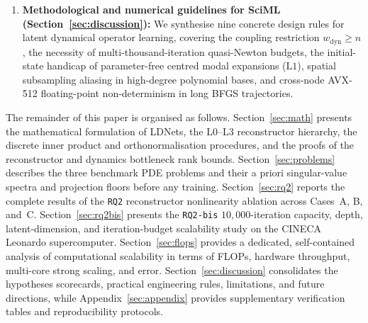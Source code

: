 \begin{enumerate}[leftmargin=2em]
  \item \textbf{Methodological and numerical guidelines for SciML (Section~\ref{sec:discussion}):} We synthesise nine concrete design rules for latent dynamical operator learning, covering the coupling restriction $w_{\mathrm{dyn}} \ge n$, the necessity of multi-thousand-iteration quasi-Newton budgets, the initial-state handicap of parameter-free centred modal expansions ($\mathrm{L1}$), spatial subsampling aliasing in high-degree polynomial bases, and cross-node AVX-512 floating-point non-determinism in long BFGS trajectories.
\end{enumerate}

The remainder of this paper is organised as follows. Section~\ref{sec:math} presents the mathematical formulation of LDNets, the $\mathrm{L0}$--$\mathrm{L3}$ reconstructor hierarchy, the discrete inner product and orthonormalisation procedures, and the proofs of the reconstructor and dynamics bottleneck rank bounds. Section~\ref{sec:problems} describes the three benchmark PDE problems and their a priori singular-value spectra and projection floors before any training. Section~\ref{sec:rq2} reports the complete results of the \texttt{RQ2} reconstructor nonlinearity ablation across Cases~A, B, and~C. Section~\ref{sec:rq2bis} presents the \texttt{RQ2-bis} $10{,}000$-iteration capacity, depth, latent-dimension, and iteration-budget scalability study on the CINECA Leonardo supercomputer. Section~\ref{sec:flops} provides a dedicated, self-contained analysis of computational scalability in terms of FLOPs, hardware throughput, multi-core strong scaling, and error. Section~\ref{sec:discussion} consolidates the hypotheses scorecards, practical engineering rules, limitations, and future directions, while Appendix~\ref{sec:appendix} provides supplementary verification tables and reproducibility protocols.
